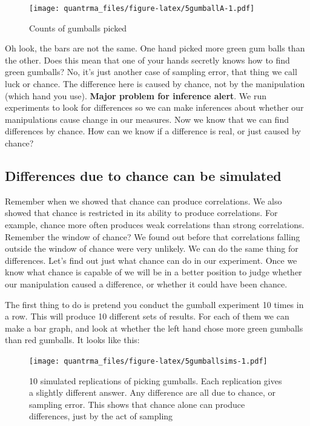 \documentclass[
]{book}
\begin{document}
\begin{figure}
\centering
\texttt{[image: quantrma\_files/figure-latex/5gumballA-1.pdf]}
\caption{\label{fig:5gumballA}Counts of gumballs picked}
\end{figure}

Oh look, the bars are not the same. One hand picked more green gum balls than the other. Does this mean that one of your hands secretly knows how to find green gumballs? No, it's just another case of sampling error, that thing we call luck or chance. The difference here is caused by chance, not by the manipulation (which hand you use). \textbf{Major problem for inference alert}. We run experiments to look for differences so we can make inferences about whether our manipulations cause change in our measures. Now we know that we can find differences by chance. How can we know if a difference is real, or just caused by chance?

\hypertarget{differences-due-to-chance-can-be-simulated}{%
\subsection{Differences due to chance can be simulated}\label{differences-due-to-chance-can-be-simulated}}

Remember when we showed that chance can produce correlations. We also showed that chance is restricted in its ability to produce correlations. For example, chance more often produces weak correlations than strong correlations. Remember the window of chance? We found out before that correlations falling outside the window of chance were very unlikely. We can do the same thing for differences. Let's find out just what chance can do in our experiment. Once we know what chance is capable of we will be in a better position to judge whether our manipulation caused a difference, or whether it could have been chance.

The first thing to do is pretend you conduct the gumball experiment 10 times in a row. This will produce 10 different sets of results. For each of them we can make a bar graph, and look at whether the left hand chose more green gumballs than red gumballs. It looks like this:

\begin{figure}
\centering
\texttt{[image: quantrma\_files/figure-latex/5gumballsims-1.pdf]}
\caption{\label{fig:5gumballsims}10 simulated replications of picking gumballs. Each replication gives a slightly different answer. Any difference are all due to chance, or sampling error. This shows that chance alone can produce differences, just by the act of sampling}
\end{figure}
\end{document}
